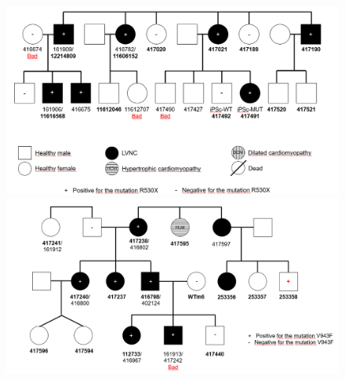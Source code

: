 \begin{figure}[htbp]
\centering
\includegraphics[width = \textwidth]{figs/pedigri1.png}
\includegraphics[width = \textwidth]{figs/pedigri2.png}
\end{figure}

